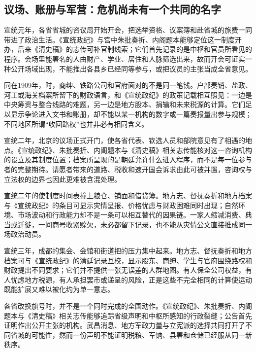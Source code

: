 \subsection{议场、账册与军营：危机尚未有一个共同的名字}

宣统元年，各省省城的咨议局开始开会，把选举资格、议案簿和赴省城的旅费一同带进了政治生活。《宣统政纪》与宫中朱批奏折、内阁题本能够定位这一制度开办，后来《清史稿》的志传可补官制线索；它们首先记录的是中枢和官员所看见的程序。会场里能署名的人由财产、学业、居住和人脉筛选出来，故而开会可证实一种公开场域出现，不能推出各县乡已经同等参与，或把议员的主张当成全省意见。

同在1909年，时，商绅、铁路公司和官府面对的不是同一笔钱。户部奏销、盐政、河工或海关档案所留下的财政语言，和《宣统政纪》的政策记载相互照见：一边是中央筹资与整合线路的难题，另一边是地方股本、捐输和未来税源的计算。它们足以显示争论进入文书和账册，却不能以某一机构的数字或一篇奏报量出参与规模；不同地区所谓“收回路权”也并非必有相同含义。

宣统二年，北京的议场正式开门，使各省代表、钦选人员和部院意见有了相遇的地点。《宣统政纪》、朱批奏折、内阁题本与《清史稿》相关志传能核对这一咨询机构的设立及其制度位置；档案所呈现的是朝廷允许什么进入程序，而不是每一位参与者的完整期待。请愿者带来的道路、税收和速开国会诉求由此可被并置，咨询权与立法权的边界也因此更难被含混处理。

宣统二年的使制度时间表撞上粮仓、铺面和借贷簿。地方志、督抚奏折和地方档案与《宣统政纪》的条目可显示灾情呈报、价格忧虑与财政困难同时出现；自然环境、市场波动和行政能力却不是一条可以相互替代的因果链。一家人缩减消费、典当或迁徙，一间商号收紧赊欠，未必都留下记录，也不能从灾情公文直接推成同一场政治动员。

宣统三年，成都的集会、会馆和街道把的压力集中起来。地方志、督抚奏折和地方档案可与《宣统政纪》的清廷记录互校，显示股东、商绅、学生与官府围绕路权和财政提出不同要求；它们并不提供一张无误差的人群地图。有人保全公司权益，有人忧虑地方税源，有人承担罢市或递呈的风险，正是这些不完全相同的计算使运动既能扩展又难以被化约为单一意志。

各省改换旗号时，并不是一个同时完成的全国动作。《宣统政纪》、朱批奏折、内阁题本与《清史稿》相关志传能够追踪省级声明和中枢所感知的行政裂缝；公告首先证明作出公开主张的机构。武昌消息、地方军政力量与立宪派的选择共同打开了不同省城的可能性，然而一份声明不能证明税粮、军饷、县署和仓储已经服从同一新秩序。


